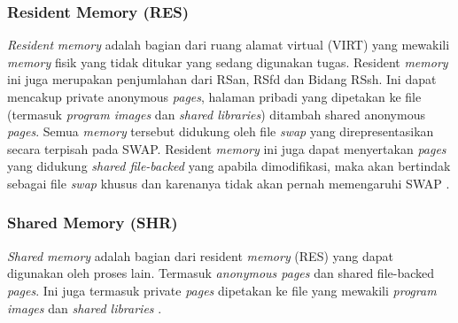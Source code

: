 
\subsubsection{Resident Memory (RES)}

\textit{Resident} \textit{memory} adalah bagian dari ruang alamat virtual (VIRT) yang mewakili \textit{memory} fisik yang tidak ditukar yang sedang digunakan tugas. Resident \textit{memory} ini juga merupakan penjumlahan dari RSan, RSfd dan Bidang RSsh. Ini dapat mencakup private anonymous \textit{pages}, halaman pribadi yang dipetakan ke file (termasuk
\textit{program images} dan \textit{shared libraries}) ditambah shared anonymous \textit{pages}. Semua \textit{memory} tersebut didukung oleh file \textit{swap} yang direpresentasikan secara terpisah pada SWAP. Resident \textit{memory} ini juga dapat menyertakan \textit{pages} yang didukung \textit{shared file-backed} yang apabila dimodifikasi, maka akan bertindak sebagai file \textit{swap} khusus dan karenanya tidak akan pernah memengaruhi SWAP \cite{manual:linux}.





\subsubsection{Shared Memory (SHR)}

\textit{Shared} \textit{memory} adalah bagian dari resident \textit{memory} (RES) yang dapat digunakan oleh proses lain. Termasuk \textit{anonymous pages} dan shared file-backed \textit{pages}. Ini juga termasuk private \textit{pages} dipetakan ke file yang mewakili \textit{program images} dan \textit{shared libraries} \cite{manual:linux}. 

